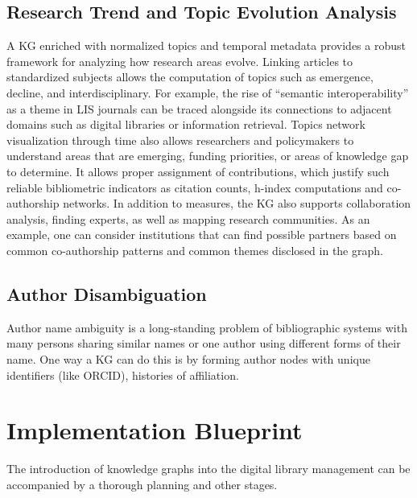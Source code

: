 \documentclass[12pt,a4paper]{article}
\begin{document}
\subsection{Research Trend and Topic Evolution Analysis}
A KG enriched with normalized topics and temporal metadata provides a robust framework for analyzing how research areas evolve. Linking articles to standardized subjects allows the computation of topics such as emergence, decline, and interdisciplinary. For example, the rise of “semantic interoperability” as a theme in LIS journals can be traced alongside its connections to adjacent domains such as digital libraries or information retrieval. Topics network visualization through time also allows researchers and policymakers to understand areas that are emerging, funding priorities, or areas of knowledge gap to determine. It allows proper assignment of contributions, which justify such reliable bibliometric indicators as citation counts, h-index computations and co-authorship networks. In addition to measures, the KG also supports collaboration analysis, finding experts, as well as mapping research communities. As an example, one can consider institutions that can find possible partners based on common co-authorship patterns and common themes disclosed in the graph.

\subsection{Author Disambiguation}
Author name ambiguity is a long-standing problem of bibliographic systems with many persons sharing similar names or one author using different forms of their name. One way a KG can do this is by forming author nodes with unique identifiers (like ORCID), histories of affiliation.

\section{Implementation Blueprint}
The introduction of knowledge graphs into the digital library management can be accompanied by a thorough planning and other stages.
\end{document}
